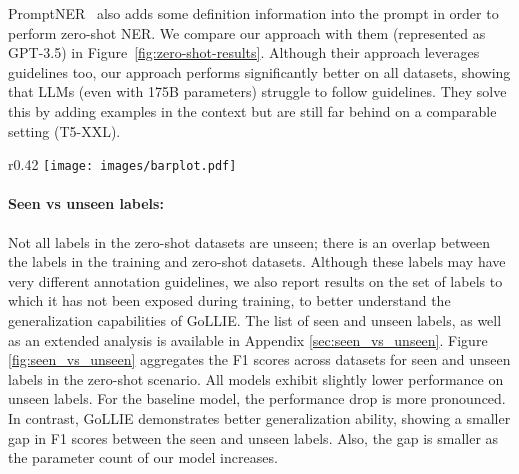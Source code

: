 PromptNER~\citep{DBLP:journals/corr/abs-2305-12217} also adds some definition information into the prompt in order to perform zero-shot NER. We compare our approach with them (represented as GPT-3.5) in Figure~\ref{fig:zero-shot-results}. Although their approach leverages guidelines too, our approach performs significantly better on all datasets, showing that LLMs (even with 175B parameters) struggle to follow guidelines. They solve this by adding examples in the context but are still far behind on a comparable setting (T5-XXL).

\begin{wrapfigure}{r}{0.42\textwidth}
    \centering
    \vspace{-1.5em}
    \texttt{[image: images/barplot.pdf]}
    \vspace{-1.0em}
    \caption{Seen vs unseen label zero-shot performance, results aggregated from all datasets.}
    \label{fig:seen_vs_unseen}
\end{wrapfigure}

\paragraph{Seen vs unseen labels:} Not all labels in the zero-shot datasets are unseen; there is an overlap between the labels in the training and zero-shot datasets. Although these labels may have very different annotation guidelines, we also report results on the set of labels to which it has not been exposed during training, to better understand the generalization capabilities of GoLLIE. The list of seen and unseen labels, as well as an extended analysis is available in Appendix \ref{sec:seen_vs_unseen}. Figure \ref{fig:seen_vs_unseen} aggregates the F1 scores across datasets for seen and unseen labels in the zero-shot scenario. All models exhibit slightly lower performance on unseen labels. For the baseline model, the performance drop is more pronounced. In contrast, GoLLIE demonstrates better generalization ability, showing a smaller gap in F1 scores between the seen and unseen labels. Also, the gap is smaller as the parameter count of our model increases. %

